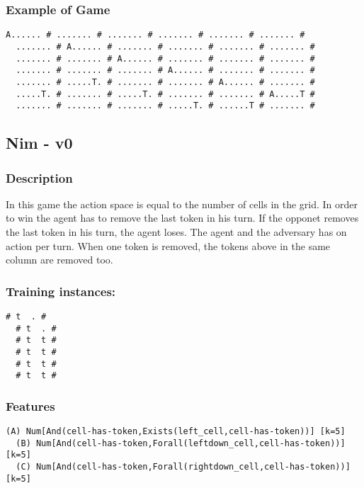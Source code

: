 \documentclass[a4paper]{article}
\begin{document}
\subsubsection{Example of Game}
\begin{Verbatim}[fontsize=\footnotesize]
  A...... # ....... # ....... # ....... # ....... # ....... #
  ....... # A...... # ....... # ....... # ....... # ....... #
  ....... # ....... # A...... # ....... # ....... # ....... #
  ....... # ....... # ....... # A...... # ....... # ....... #
  ....... # .....T. # ....... # ....... # A...... # ....... #
  .....T. # ....... # .....T. # ....... # ....... # A.....T #
  ....... # ....... # ....... # .....T. # ......T # ....... #
\end{Verbatim}

\subsection{Nim - v0}
\subsubsection{Description}
In this game the action space is equal to the number of cells in the grid. In order to win the agent has to remove the last token in his turn. If the opponet removes the last token in his turn, the agent loses. The agent and the adversary has on action per turn. When one token is removed, the tokens above in the same column are removed too.

\subsubsection{Training instances:}
\begin{Verbatim}[fontsize=\footnotesize]
  # t  . #
  # t  . #
  # t  t #
  # t  t #
  # t  t #
  # t  t #
\end{Verbatim}

\subsubsection{Features}
\begin{Verbatim}[fontsize=\footnotesize]
  (A) Num[And(cell-has-token,Exists(left_cell,cell-has-token))] [k=5]
  (B) Num[And(cell-has-token,Forall(leftdown_cell,cell-has-token))] [k=5]
  (C) Num[And(cell-has-token,Forall(rightdown_cell,cell-has-token))] [k=5]

\end{Verbatim}
\end{document}
